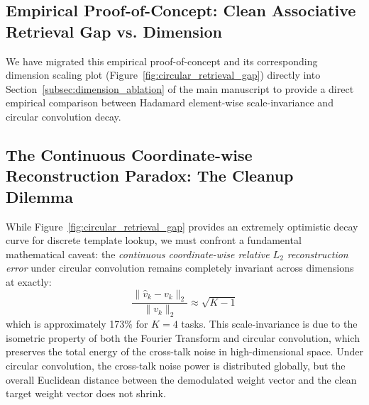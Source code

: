 \documentclass{article}
\theoremstyle{plain}
\theoremstyle{definition}
\theoremstyle{remark}
\begin{document}
\subsection{Empirical Proof-of-Concept: Clean Associative Retrieval Gap vs. Dimension}
We have migrated this empirical proof-of-concept and its corresponding dimension scaling plot (Figure~\ref{fig:circular_retrieval_gap}) directly into Section~\ref{subsec:dimension_ablation} of the main manuscript to provide a direct empirical comparison between Hadamard element-wise scale-invariance and circular convolution decay.

\subsection{The Continuous Coordinate-wise Reconstruction Paradox: The Cleanup Dilemma}

While Figure~\ref{fig:circular_retrieval_gap} provides an extremely optimistic decay curve for discrete template lookup, we must confront a fundamental mathematical caveat: the \textit{continuous coordinate-wise relative $L_2$ reconstruction error} under circular convolution remains completely invariant across dimensions at exactly:
\begin{equation}
\frac{\|\hat{v}_k - v_k\|_2}{\|v_k\|_2} \approx \sqrt{K-1}
\end{equation}
which is approximately 173\% for $K=4$ tasks. This scale-invariance is due to the isometric property of both the Fourier Transform and circular convolution, which preserves the total energy of the cross-talk noise in high-dimensional space. Under circular convolution, the cross-talk noise power is distributed globally, but the overall Euclidean distance between the demodulated weight vector and the clean target weight vector does not shrink.
\end{document}
